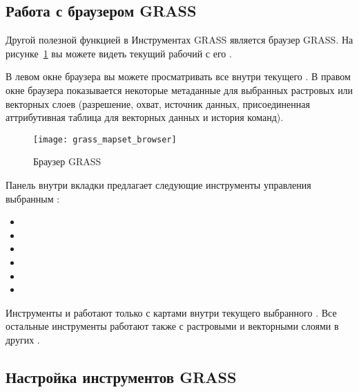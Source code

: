 \subsection{Работа с браузером GRASS} 

Другой полезной функцией в Инструментах GRASS является браузер
 GRASS. На рисунке~\ref{fig:grass_mapset_browser} вы
можете видеть текущий рабочий  с его
.

В левом окне браузера вы можете просматривать все 
внутри текущего . В правом окне браузера показывается
некоторые метаданные для выбранных растровых или векторных слоев
(разрешение, охват, источник данных, присоединенная аттрибутивная
таблица для векторных данных и история команд).

\begin{figure}[h]
 \centering
 \texttt{[image: grass\_mapset\_browser]}
 \caption{Браузер GRASS \nixcaption}\label{fig:grass_mapset_browser}
\end{figure}

Панель внутри вкладки  предлагает следующие инструменты
управления выбранным :

\begin{itemize}[label=--]
\item {}
\item {}
\item {}
\item {}
\item {}
\item {}
\end{itemize}

Инструменты 
и  работают только
с картами внутри текущего выбранного . Все остальные
инструменты работают также с растровыми и векторными слоями в других
.


\subsection{Настройка инструментов GRASS} 
\label{sec:toolbox-customizing}

